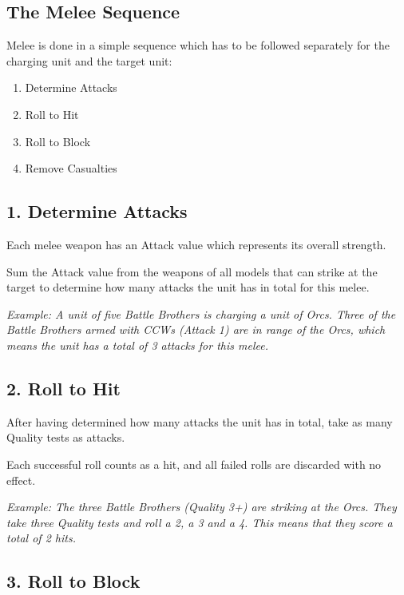 \documentclass[9pt, a4paper, bookmarks=false]{extarticle}            %
\begin{document}
\begin{multicols}{2}
\subsection{The Melee Sequence}

Melee is done in a simple sequence which has to be followed separately for the charging unit and the target unit:

\begin{enumerate}
  \item Determine Attacks
  \item Roll to Hit
  \item Roll to Block
  \item Remove Casualties
\end{enumerate}

\subsection{1. Determine Attacks}

Each melee weapon has an Attack value which represents its overall strength.

Sum the Attack value from the weapons of all models that can strike at the target to determine how many attacks the unit has in total for this melee.

\textit{Example: A unit of five Battle Brothers is charging a unit of Orcs. Three of the Battle Brothers armed with CCWs (Attack 1) are in range of the Orcs, which means the unit has a total of 3 attacks for this melee.}

\subsection{2. Roll to Hit}

After having determined how many attacks the unit has in total, take as many Quality tests as attacks.

Each successful roll counts as a hit, and all failed rolls are discarded with no effect.

\textit{Example: The three Battle Brothers (Quality 3+) are striking at the Orcs. They take three Quality tests and roll a 2, a 3 and a 4. This means that they score a total of 2 hits.}

\subsection{3. Roll to Block}


\end{multicols}
\end{document}
